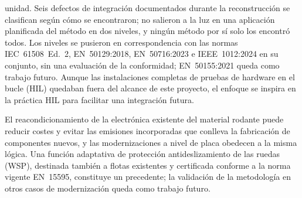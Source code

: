 unidad. Seis defectos de integración documentados durante la reconstrucción se clasifican según cómo se encontraron; no salieron a la luz en una aplicación planificada del método en dos niveles, y ningún método por sí solo los encontró todos. Los niveles se pusieron en correspondencia con las normas IEC~61508~Ed.~2, EN~50129:2018, EN~50716:2023 e IEEE~1012:2024 en su conjunto, sin una evaluación de la conformidad; EN~50155:2021 queda como trabajo futuro. Aunque las instalaciones completas de pruebas de hardware en el bucle (HIL) quedaban fuera del alcance de este proyecto, el enfoque se inspira en la práctica HIL para facilitar una integración futura.

El reacondicionamiento de la electrónica existente del material rodante puede reducir costes y evitar las emisiones incorporadas que conlleva la fabricación de componentes nuevos, y las modernizaciones a nivel de placa obedecen a la misma lógica. Una función adaptativa de protección antideslizamiento de las ruedas (WSP), destinada también a flotas existentes y certificada conforme a la norma vigente EN~15595, constituye un precedente; la validación de la metodología en otros casos de modernización queda como trabajo futuro.
